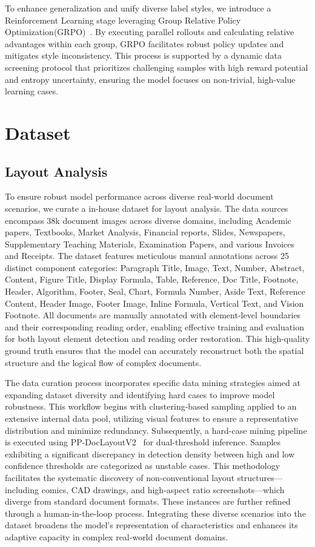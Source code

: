 \documentclass[11pt, a4paper,logo,  copyright, nonumbering]{paddleocr}
\begin{document}
To enhance generalization and unify diverse label styles, we introduce a Reinforcement Learning stage leveraging Group Relative Policy Optimization(GRPO)~\cite{shao2024deepseekmath}. By executing parallel rollouts and calculating relative advantages within each group, GRPO facilitates robust policy updates and mitigates style inconsistency. This process is supported by a dynamic data screening protocol that prioritizes challenging samples with high reward potential and entropy uncertainty, ensuring the model focuses on non-trivial, high-value learning cases.


\section{Dataset}


\subsection{Layout Analysis}

To ensure robust model performance across diverse real-world document scenarios, we curate a in-house dataset for layout analysis. The data sources encompass 38k document images across diverse domains, including Academic papers, Textbooks, Market Analysis, Financial reports, Slides, Newspapers, Supplementary Teaching Materials, Examination Papers, and various Invoices and Receipts. The dataset features meticulous manual annotations across 25 distinct component categories: Paragraph Title, Image, Text, Number, Abstract, Content, Figure Title, Display Formula, Table, Reference, Doc Title, Footnote, Header, Algorithm, Footer, Seal, Chart, Formula Number, Aside Text, Reference Content, Header Image, Footer Image, Inline Formula, Vertical Text, and Vision Footnote. All documents are manually annotated with element-level boundaries and their corresponding reading order, enabling effective training and evaluation for both layout element detection and reading order restoration. This high-quality ground truth ensures that the model can accurately reconstruct both the spatial structure and the logical flow of complex documents.

The data curation process incorporates specific data mining strategies aimed at expanding dataset diversity and identifying hard cases to improve model robustness. This workflow begins with clustering-based sampling applied to an extensive internal data pool, utilizing visual features to ensure a representative distribution and minimize redundancy. Subsequently, a hard-case mining pipeline is executed using PP-DocLayoutV2~\cite{cui2025paddleocrvl} for dual-threshold inference. Samples exhibiting a significant discrepancy in detection density between high and low confidence thresholds are categorized as unstable cases. This methodology facilitates the systematic discovery of non-conventional layout structures—including comics, CAD drawings, and high-aspect ratio screenshots—which diverge from standard document formats. These instances are further refined through a human-in-the-loop process. Integrating these diverse scenarios into the dataset broadens the model's representation of characteristics and enhances its adaptive capacity in complex real-world document domains.
\end{document}
